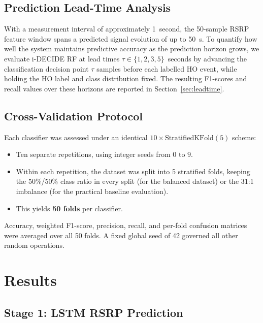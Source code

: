 \documentclass[journal]{IEEEtran}
\begin{document}
\subsection{Prediction Lead-Time Analysis}

With a measurement interval of approximately 1~second, the 50-sample
RSRP feature window spans a predicted signal evolution of up to
\SI{50}{\second}. To quantify how well the system maintains predictive
accuracy as the prediction horizon grows, we evaluate i-DECIDE RF
at lead times $\tau \in \{1, 2, 3, 5\}$~seconds by advancing the
classification decision point $\tau$ samples before each labelled HO
event, while holding the HO label and class distribution fixed. The
resulting F1-scores and recall values over these horizons are reported
in Section~\ref{sec:leadtime}.

\subsection{Cross-Validation Protocol}

Each classifier was assessed under an identical
$10\times\text{StratifiedKFold}(5)$ scheme:
\begin{itemize}
  \item Ten separate repetitions, using integer seeds from $0$ to $9$.
  \item Within each repetition, the dataset was split into 5 stratified
  folds, keeping the 50\%/50\% class ratio in every split (for the
  balanced dataset) or the 31:1 imbalance (for the practical baseline
  evaluation).
  \item This yields \textbf{50 folds} per classifier.
\end{itemize}
Accuracy, weighted F1-score, precision, recall, and per-fold confusion
matrices were averaged over all 50 folds. A fixed global seed of 42
governed all other random operations.

\section{Results}
\label{sec:results}

\subsection{Stage 1: LSTM RSRP Prediction}
\end{document}
